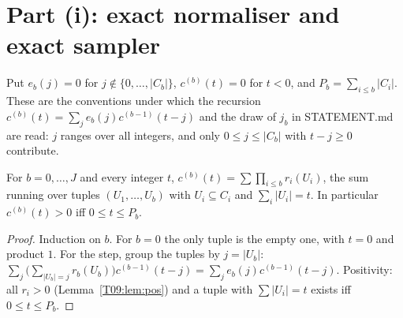 \documentclass[11pt]{report}
\begin{document}
\section{Part (i): exact normaliser and exact sampler}

Put $e_b(j)=0$ for $j\notin\{0,\dots,|C_b|\}$, $c^{(b)}(t)=0$ for $t<0$, and $P_b=\sum_{i\le b}|C_i|$. These are the conventions under which the recursion $c^{(b)}(t)=\sum_je_b(j)c^{(b-1)}(t-j)$ and the draw of $j_b$ in STATEMENT.md are read: $j$ ranges over all integers, and only $0\le j\le|C_b|$ with $t-j\ge0$ contribute.

\begin{T09lemma}\label{T09:lem:conv}
For $b=0,\dots,J$ and every integer $t$, $c^{(b)}(t)=\sum\prod_{i\le b}r_i(U_i)$, the sum running over tuples $(U_1,\dots,U_b)$ with $U_i\subseteq C_i$ and $\sum_i|U_i|=t$. In particular $c^{(b)}(t)>0$ iff $0\le t\le P_b$.
\end{T09lemma}
\begin{proof}
Induction on $b$. For $b=0$ the only tuple is the empty one, with $t=0$ and product $1$. For the step, group the tuples by $j=|U_b|$: $\sum_{j}\big(\sum_{|U_b|=j}r_b(U_b)\big)c^{(b-1)}(t-j)=\sum_je_b(j)c^{(b-1)}(t-j)$. Positivity: all $r_i>0$ (Lemma~\ref{T09:lem:pos}) and a tuple with $\sum|U_i|=t$ exists iff $0\le t\le P_b$.
\end{proof}
\end{document}
